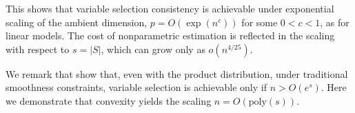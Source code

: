 This shows that variable selection consistency is achievable under
exponential scaling of the ambient dimension, $p = O(\exp(n^c))$
for some $0<c<1$, as for linear models. The cost of nonparametric estimation is
reflected in the scaling with respect to $s=|S|$, which can grow only
as $o(n^{4/25})$.

We remark that \citet{dalalyan:12} show that, even with the product distribution,
 under traditional smoothness
constraints, variable selection is achievable only if $n > O(e^s)$. 
Here we demonstrate that convexity yields the scaling $n =
O(\textrm{poly}(s))$.


